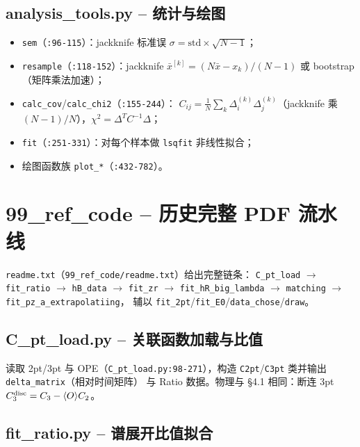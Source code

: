 \documentclass[UTF8]{ctexart}
\begin{document}
\subsection{analysis\_tools.py -- 统计与绘图}

\begin{itemize}
  \item \texttt{sem}（\texttt{:96-115}）：jackknife 标准误
        $\sigma=\mathrm{std}\times\sqrt{N-1}$；
  \item \texttt{resample}（\texttt{:118-152}）：jackknife
        $\bar x^{[k]} = (N\bar x - x_k)/(N-1)$ 或 bootstrap（矩阵乘法加速）；
  \item \texttt{calc\_cov}/\texttt{calc\_chi2}（\texttt{:155-244}）：
        $C_{ij}=\frac{1}{N}\sum_k\Delta_i^{(k)}\Delta_j^{(k)}$（jackknife 乘
        $(N-1)/N$），$\chi^2=\Delta^T C^{-1}\Delta$；
  \item \texttt{fit}（\texttt{:251-331}）：对每个样本做 \texttt{lsqfit} 非线性拟合；
  \item 绘图函数族 \texttt{plot\_*}（\texttt{:432-782}）。
\end{itemize}

\section{99\_ref\_code -- 历史完整 PDF 流水线}

\texttt{readme.txt}（\texttt{99\_ref\_code/readme.txt}）给出完整链条：
\texttt{C\_pt\_load} $\to$ \texttt{fit\_ratio} $\to$ \texttt{hB\_data}
$\to$ \texttt{fit\_zr} $\to$ \texttt{fit\_hR\_big\_lambda}
$\to$ \texttt{matching} $\to$ \texttt{fit\_pz\_a\_extrapolatiing}，
辅以 \texttt{fit\_2pt}/\texttt{fit\_E0}/\texttt{data\_chose}/\texttt{draw}。

\subsection{C\_pt\_load.py -- 关联函数加载与比值}

读取 2pt/3pt 与 OPE（\texttt{C\_pt\_load.py:98-271}），构造
\texttt{C2pt}/\texttt{C3pt} 类并输出 \texttt{delta\_matrix}（相对时间矩阵）
与 Ratio 数据。物理与 \S4.1 相同：断连 3pt $C_3^{\rm disc}=C_3-\langle O\rangle C_2$。

\subsection{fit\_ratio.py -- 谱展开比值拟合}
\end{document}
